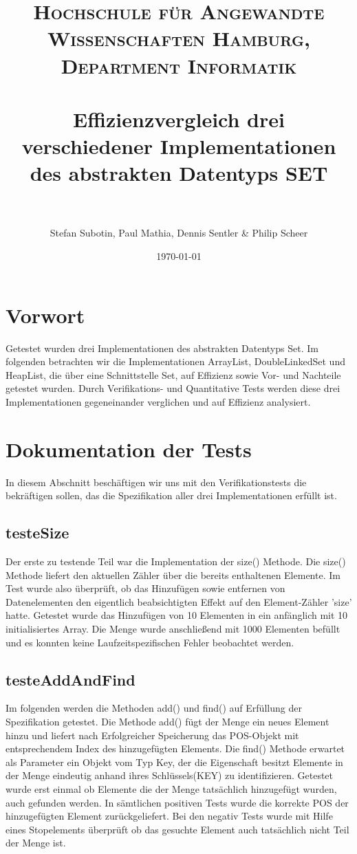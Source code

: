 \documentclass[paper=a4, fontsize=11pt]{scrartcl} %
\title{	
\normalfont \normalsize 
\textsc{Hochschule f\"ur Angewandte Wissenschaften Hamburg, Department Informatik} \\ [25pt] %
\horrule{0.5pt} \\[0.4cm] %
\huge Effizienzvergleich drei verschiedener Implementationen des abstrakten Datentyps SET \\ %
\horrule{2pt} \\[0.5cm] %
}
\author{Stefan Subotin, Paul Mathia, Dennis Sentler & Philip Scheer} %
\date{\normalsize\today} %
\numberwithin{equation}{section} %
\numberwithin{figure}{section} %
\numberwithin{table}{section} %
\begin{document}
\maketitle %
\section{Vorwort}
Getestet wurden drei Implementationen des abstrakten Datentyps Set. Im folgenden betrachten wir die Implementationen ArrayList, DoubleLinkedSet und HeapList, die über eine Schnittstelle Set, auf Effizienz sowie Vor- und Nachteile getestet wurden. Durch Verifikations- und Quantitative Tests werden diese drei Implementationen gegeneinander verglichen und auf Effizienz analysiert.\\


\section{Dokumentation der Tests}
In diesem Abschnitt beschäftigen wir uns mit den Verifikationstests die bekräftigen sollen, das die Spezifikation aller drei Implementationen erfüllt ist. 

\subsection{testeSize}
Der erste zu testende Teil war die Implementation der size() Methode. Die size() Methode liefert den aktuellen Zähler über die bereits enthaltenen Elemente.
Im Test wurde also überprüft, ob das Hinzufügen sowie entfernen von Datenelementen den eigentlich beabsichtigten Effekt auf den Element-Zähler 'size' hatte. 
Getestet wurde das Hinzufügen von 10 Elementen in ein anfänglich mit 10 initialisiertes Array. Die Menge wurde anschließend mit 1000 Elementen befüllt
und es konnten keine Laufzeitspezifischen Fehler beobachtet werden. 

\subsection{testeAddAndFind}
Im folgenden werden die Methoden add() und find() auf Erfüllung der Spezifikation getestet. Die Methode add() fügt der Menge ein neues Element hinzu und liefert nach
Erfolgreicher Speicherung das POS-Objekt mit entsprechendem Index des hinzugefügten Elements. Die find() Methode erwartet als Parameter ein Objekt vom Typ Key, der die
Eigenschaft besitzt Elemente in der Menge eindeutig anhand ihres Schlüssels(KEY) zu identifizieren. Getestet wurde erst einmal ob Elemente die der Menge tatsächlich hinzugefügt
wurden, auch gefunden werden. In sämtlichen positiven Tests wurde die korrekte POS der hinzugefügten Element zurückgeliefert. Bei den negativ Tests wurde mit Hilfe eines
Stopelements überprüft ob das gesuchte Element auch tatsächlich nicht Teil der Menge ist.  
\end{document}
